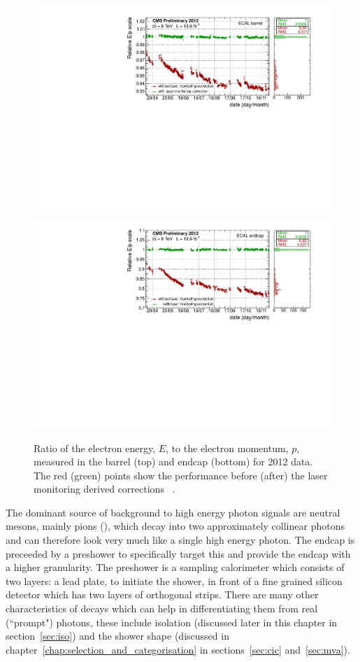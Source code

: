 \begin{figure}
  \includegraphics[width=\textwidth]{ch2_cms_exp/plots/ecal_EB_lasercorrs.pdf} \\
  \includegraphics[width=\textwidth]{ch2_cms_exp/plots/ecal_EE_lasercorrs.pdf} 
  \caption[ECAL laser corrections]{Ratio of the electron energy, $E$, to the electron momentum, $p$, measured in the \CMS barrel (top) and endcap (bottom) for 2012 data. The red (green) points show the performance before (after) the laser monitoring derived corrections ~\cite{cms-ecal-performance-2012}.}
  \label{fig:ecal_laser_corrs}
\end{figure}

The dominant source of background to high energy photon signals are neutral mesons, mainly pions (\pizero), which decay into two approximately collinear photons and can therefore look very much like a single high energy photon. The \ECAL endcap is preceeded by a preshower to specifically target this and provide the endcap with a higher granularity. The preshower is a sampling calorimeter which consists of two layers: a lead plate, to initiate the shower, in front of a fine grained silicon detector which has two layers of orthogonal strips. There are many other characteristics of \pizero decays which can help in differentiating them from real (``prompt") photons, these include isolation (discussed later in this chapter in section~\ref{sec:iso}) and the shower shape (discussed in chapter~\ref{chap:selection_and_categorisation} in sections~\ref{sec:cic} and~\ref{sec:mva}).


